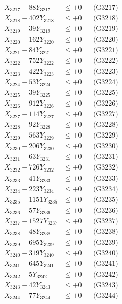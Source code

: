 \documentclass[a4paper,10pt]{article}
\begin{document}
{\begin{align}
X_{3217} - 88Y_{3217} &\leq +0 && \text{(G3217)} \\
X_{3218} - 402Y_{3218} &\leq +0 && \text{(G3218)} \\
X_{3219} - 39Y_{3219} &\leq +0 && \text{(G3219)} \\
X_{3220} - 162Y_{3220} &\leq +0 && \text{(G3220)} \\
\allowbreak
X_{3221} - 84Y_{3221} &\leq +0 && \text{(G3221)} \\
X_{3222} - 752Y_{3222} &\leq +0 && \text{(G3222)} \\
X_{3223} - 422Y_{3223} &\leq +0 && \text{(G3223)} \\
X_{3224} - 53Y_{3224} &\leq +0 && \text{(G3224)} \\
X_{3225} - 39Y_{3225} &\leq +0 && \text{(G3225)} \\
X_{3226} - 912Y_{3226} &\leq +0 && \text{(G3226)} \\
X_{3227} - 114Y_{3227} &\leq +0 && \text{(G3227)} \\
X_{3228} - 92Y_{3228} &\leq +0 && \text{(G3228)} \\
X_{3229} - 563Y_{3229} &\leq +0 && \text{(G3229)} \\
X_{3230} - 206Y_{3230} &\leq +0 && \text{(G3230)} \\
\allowbreak
X_{3231} - 63Y_{3231} &\leq +0 && \text{(G3231)} \\
X_{3232} - 726Y_{3232} &\leq +0 && \text{(G3232)} \\
X_{3233} - 41Y_{3233} &\leq +0 && \text{(G3233)} \\
X_{3234} - 223Y_{3234} &\leq +0 && \text{(G3234)} \\
X_{3235} - 1151Y_{3235} &\leq +0 && \text{(G3235)} \\
X_{3236} - 57Y_{3236} &\leq +0 && \text{(G3236)} \\
X_{3237} - 1527Y_{3237} &\leq +0 && \text{(G3237)} \\
X_{3238} - 48Y_{3238} &\leq +0 && \text{(G3238)} \\
X_{3239} - 695Y_{3239} &\leq +0 && \text{(G3239)} \\
X_{3240} - 319Y_{3240} &\leq +0 && \text{(G3240)} \\
\allowbreak
X_{3241} - 645Y_{3241} &\leq +0 && \text{(G3241)} \\
X_{3242} - 5Y_{3242} &\leq +0 && \text{(G3242)} \\
X_{3243} - 42Y_{3243} &\leq +0 && \text{(G3243)} \\
X_{3244} - 77Y_{3244} &\leq +0 && \text{(G3244)} \\

\end{align}}
\end{document}
